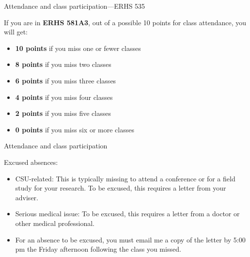 \documentclass[
  10pt,
  ignorenonframetext,
]{beamer}
\providecommand{\tightlist}{%
  \setlength{\itemsep}{0pt}\setlength{\parskip}{0pt}}
\begin{document}
\begin{frame}{Attendance and class participation---ERHS 535}
\protect\hypertarget{attendance-and-class-participationerhs-535-2}{}

If you are in \textbf{ERHS 581A3}, out of a possible 10 points for class
attendance, you will get:

\begin{itemize}
\tightlist
\item
  \textbf{10 points} if you miss one or fewer classes
\item
  \textbf{8 points} if you miss two classes
\item
  \textbf{6 points} if you miss three classes
\item
  \textbf{4 points} if you miss four classes
\item
  \textbf{2 points} if you miss five classes
\item
  \textbf{0 points} if you miss six or more classes
\end{itemize}

\end{frame}

\begin{frame}{Attendance and class participation}
\protect\hypertarget{attendance-and-class-participation}{}

Excused absences:

\begin{itemize}
\tightlist
\item
  CSU-related: This is typically missing to attend a conference or for a
  field study for your research. To be excused, this requires a letter
  from your adviser.
\item
  Serious medical issue: To be excused, this requires a letter from a
  doctor or other medical professional.
\item
  For an absence to be excused, you must email me a copy of the letter
  by 5:00 pm the Friday afternoon following the class you missed.
\end{itemize}

\end{frame}
\end{document}
